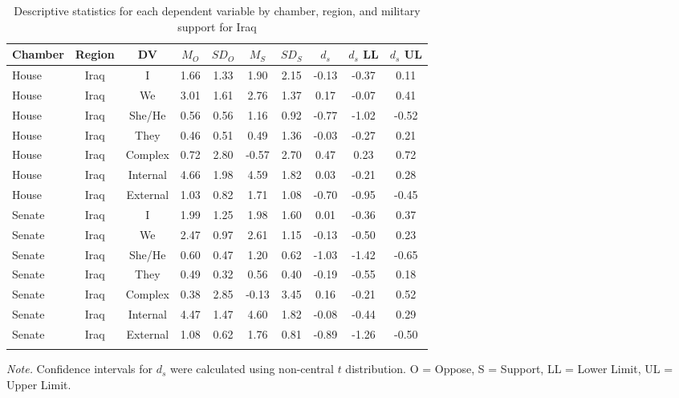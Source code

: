 \documentclass[english,,man]{apa6}
\theoremstyle{definition}
\theoremstyle{definition}
\theoremstyle{definition}
\theoremstyle{remark}
\begin{document}
\begin{table}[tbp]
\begin{center}
\begin{threeparttable}
\caption{\label{tab:Itable}Descriptive statistics for each dependent variable by chamber, 
          region, and military support for Iraq}
\small{
\begin{tabular}{lccccccccc}
\toprule
Chamber & Region & DV & $M_O$ & $SD_O$ & $M_S$ & $SD_S$ & $d_s$ & $d_s$ LL & $d_s$ UL\\
\midrule
House & Iraq & I & 1.66 & 1.33 & 1.90 & 2.15 & -0.13 & -0.37 & 0.11\\
House & Iraq & We & 3.01 & 1.61 & 2.76 & 1.37 & 0.17 & -0.07 & 0.41\\
House & Iraq & She/He & 0.56 & 0.56 & 1.16 & 0.92 & -0.77 & -1.02 & -0.52\\
House & Iraq & They & 0.46 & 0.51 & 0.49 & 1.36 & -0.03 & -0.27 & 0.21\\
House & Iraq & Complex & 0.72 & 2.80 & -0.57 & 2.70 & 0.47 & 0.23 & 0.72\\
House & Iraq & Internal & 4.66 & 1.98 & 4.59 & 1.82 & 0.03 & -0.21 & 0.28\\
House & Iraq & External & 1.03 & 0.82 & 1.71 & 1.08 & -0.70 & -0.95 & -0.45\\
Senate & Iraq & I & 1.99 & 1.25 & 1.98 & 1.60 & 0.01 & -0.36 & 0.37\\
Senate & Iraq & We & 2.47 & 0.97 & 2.61 & 1.15 & -0.13 & -0.50 & 0.23\\
Senate & Iraq & She/He & 0.60 & 0.47 & 1.20 & 0.62 & -1.03 & -1.42 & -0.65\\
Senate & Iraq & They & 0.49 & 0.32 & 0.56 & 0.40 & -0.19 & -0.55 & 0.18\\
Senate & Iraq & Complex & 0.38 & 2.85 & -0.13 & 3.45 & 0.16 & -0.21 & 0.52\\
Senate & Iraq & Internal & 4.47 & 1.47 & 4.60 & 1.82 & -0.08 & -0.44 & 0.29\\
Senate & Iraq & External & 1.08 & 0.62 & 1.76 & 0.81 & -0.89 & -1.26 & -0.50\\
\bottomrule
\addlinespace
\end{tabular}
}
\begin{tablenotes}[para]
\normalsize{\textit{Note.} Confidence intervals for $d_s$ were calculated using 
          non-central $t$ distribution. O = Oppose, S = Support, LL = Lower Limit, UL = Upper Limit.}
\end{tablenotes}
\end{threeparttable}
\end{center}
\end{table}
\end{document}

